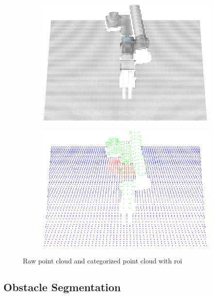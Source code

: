 \begin{figure}[h]
    \centering
    \begin{subfigure}{.5\linewidth}
      \centering
      \includegraphics[width=.95\linewidth]{figs/chp4/cloud_before.png}
    \end{subfigure}%
    \begin{subfigure}{.5\linewidth}
      \centering
      \includegraphics[width=.95\linewidth]{figs/chp4/cloud_after.png}
    \end{subfigure}
    \caption{Raw point cloud and categorized point cloud with \ac{roi}}
    \label{fig:self_ident_result}
\end{figure}

\subsection{Obstacle Segmentation}

